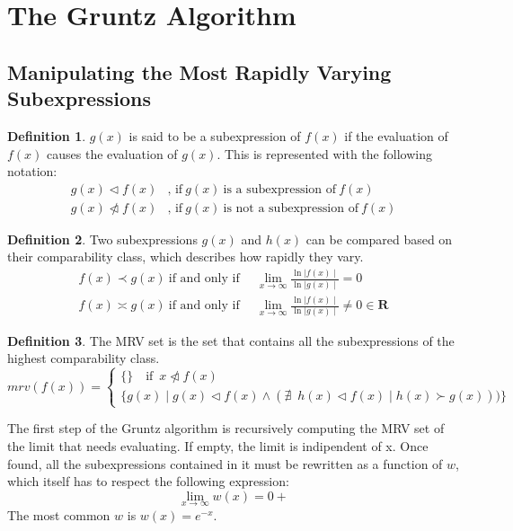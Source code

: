 \documentclass{article}
\theoremstyle{plain}
\theoremstyle{definition}
\newtheorem*{defn*}{Definition}
\theoremstyle{algorithm}
\begin{document}
	\section{The Gruntz Algorithm}
	
	\subsection{Manipulating the Most Rapidly Varying Subexpressions}
	
	\begin{defn*}
		\(g(x)\) is said to be a subexpression of \(f(x)\) if the evaluation of \(f(x)\) causes the evaluation of \(g(x)\). This is represented with the following notation:
		\[
		\begin{aligned}
			g(x) \triangleleft f(x)&\text{, if} \: g(x) \: \text{is a subexpression of} \: f(x) \\
			g(x) \ntriangleleft f(x)&\text{, if} \: g(x) \: \text{is not a subexpression of} \: f(x)
		\end{aligned}
		\]
	\end{defn*}
	
	\begin{defn*}
		Two subexpressions \(g(x)\) and \(h(x)\) can be compared based on their comparability class, which describes how rapidly they vary.
		\[
		\begin{aligned}
			f(x) \prec g(x) \: \text{if and only if} \enspace &\lim_{x \to \infty}{\frac{\ln{\mid f(x)\mid}}{\ln{\mid g(x)\mid}}} = 0 \\ 
			f(x) \asymp g(x) \: \text{if and only if} \enspace &\lim_{x \to \infty}{\frac{\ln{\mid f(x)\mid}}{\ln{\mid g(x)\mid}}} \neq 0 \in \mathbf{R}
		\end{aligned} \tag{2}
		\]
	\end{defn*} \label{defn:comparability}
	
	\begin{defn*}
		The MRV set is the set that contains all the subexpressions of the highest comparability class.
		\[
		mrv(f(x)) = \begin{cases}
			\{\} \quad \text{if} \enspace x \ntriangleleft f(x) \\
			\{g(x) \mid g(x) \triangleleft f(x) \wedge (\nexists \enspace h(x) \triangleleft f(x) \mid h(x) \succ g(x)))\}
		\end{cases}
		\]
	\end{defn*} \label{defn:mrv}
	
	The first step of the Gruntz algorithm is recursively computing the MRV set of the limit that needs evaluating. If empty, the limit is indipendent of x. 
	Once found, all the subexpressions contained in it must be rewritten as a function of \(w\), which itself has to respect the following expression: 
	\[
	\lim_{x \to \infty}{w(x)} = 0+
	\]
	The most common \(w\) is \(w(x) = e^{-x}\).
	
\end{document}

